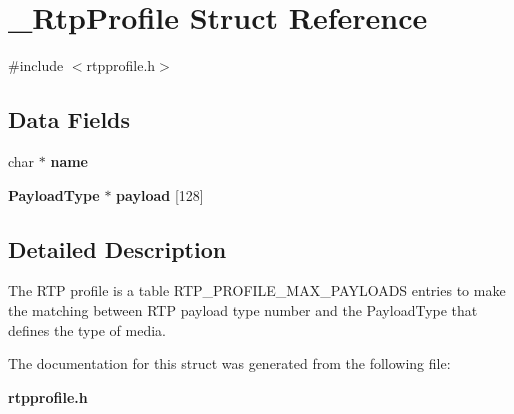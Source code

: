 \section{\+\_\+\+Rtp\+Profile Struct Reference}
\label{struct__RtpProfile}


{\ttfamily \#include $<$rtpprofile.\+h$>$}

\subsection*{Data Fields}
\begin{DoxyCompactItemize}
\item 
\mbox{\label{struct__RtpProfile_a44f3779656a2b2ad52301d33a6cc28bc}} 
char $\ast$ {\bfseries name}
\item 
\mbox{\label{struct__RtpProfile_ada5e3eb33fce445b23ab32575e030515}} 
\textbf{ Payload\+Type} $\ast$ {\bfseries payload} [128]
\end{DoxyCompactItemize}


\subsection{Detailed Description}
The R\+TP profile is a table R\+T\+P\+\_\+\+P\+R\+O\+F\+I\+L\+E\+\_\+\+M\+A\+X\+\_\+\+P\+A\+Y\+L\+O\+A\+DS entries to make the matching between R\+TP payload type number and the Payload\+Type that defines the type of media. 

The documentation for this struct was generated from the following file\+:\begin{DoxyCompactItemize}
\item 
\textbf{ rtpprofile.\+h}\end{DoxyCompactItemize}
